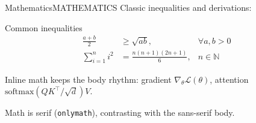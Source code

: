 \documentclass[10pt,aspectratio=169]{beamer}
\begin{document}
\begin{frame}{Mathematics}{MATHEMATICS}
  Classic inequalities and derivations:
  \begin{block}{Common inequalities}
    \vspace{-1.5mm}
    \begin{align}
      \frac{a+b}{2} &\geq \sqrt{ab},
      & \forall a,b>0 \\
      \sum_{i=1}^{n} i^2 &= \frac{n(n+1)(2n+1)}{6},
      & n \in \mathbb{N}
    \end{align}
  \end{block}
  \vspace{0.5mm}
  Inline math keeps the body rhythm: gradient $\nabla_\theta \mathcal{L}(\theta)$,
  attention $\mathrm{softmax}(QK^{\top}/\sqrt{d})V$.
  \begin{takeaway}
    Math is serif (\texttt{onlymath}), contrasting with the sans-serif body.
  \end{takeaway}
\end{frame}



\begin{frame}[plain]
  \cuhkthanks
\end{frame}
\end{document}
